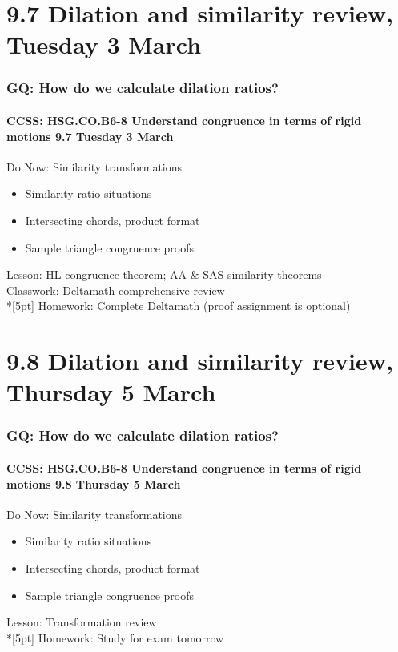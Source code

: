 \documentclass{beamer}
\begin{document}
\section{9.7 Dilation and similarity review, Tuesday 3 March}
\frame
{
  \frametitle{GQ: How do we calculate dilation ratios?}
  \framesubtitle{CCSS: HSG.CO.B6-8 Understand congruence in terms of rigid motions \hfill \alert{9.7 Tuesday 3 March}}
  \begin{block}{Do Now: Similarity transformations}
    \begin{itemize}
      \item Similarity ratio situations
      \item Intersecting chords, product format
      \item Sample triangle congruence proofs
    \end{itemize}
    \end{block}
    Lesson: HL congruence theorem; AA \& SAS similarity theorems \\
    Classwork: Deltamath comprehensive review \\*[5pt]
    Homework: Complete Deltamath (proof assignment is optional)
}

\section{9.8 Dilation and similarity review, Thursday 5 March}
\frame
{
  \frametitle{GQ: How do we calculate dilation ratios?}
  \framesubtitle{CCSS: HSG.CO.B6-8 Understand congruence in terms of rigid motions \hfill \alert{9.8 Thursday 5 March}}
  \begin{block}{Do Now: Similarity transformations}
    \begin{itemize}
      \item Similarity ratio situations
      \item Intersecting chords, product format
      \item Sample triangle congruence proofs
    \end{itemize}
    \end{block}
    Lesson: Transformation review \\*[5pt]
    Homework: Study for \alert{exam tomorrow}
}
\end{document}
